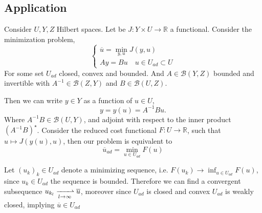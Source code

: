 \subsection{Application}
Consider $U, Y, Z$ Hilbert spaces. Let be  $J: Y\times U \rightarrow \mathbb{R}$ a functional. Consider the minimization problem,
\begin{equation*}
	\left\lbrace
	\begin{array}{l}
	\overline{u}=\underset{y,u}{\min} J(y,u) \\
	Ay=Bu \quad u \in U_{ad} \subset U
	\end{array}
	\right.
\end{equation*}
For some set $U_{ad}$ closed, convex and bounded. And $A \in \mathcal{B}(Y,Z)$ bounded and invertible with $A^{-1}\in \mathcal{B}(Z, Y)$ and $B\in \mathcal{B}(U, Z)$.

Then we can write $y \in Y$ as a function of $u \in U$,
\[
y=y(u)=A^{-1}Bu.
\]
Where $A^{-1}B \in \mathcal{B}(U, Y)$, and adjoint with respect to the inner product $(A^{-1}B)^\star$. Consider the reduced cost functional  $F:U\rightarrow \mathbb{R}$, such that $u\mapsto J(y(u), u)$, then our problem is equivalent to
\[
	\overline{u}_{ad}=\min_{u \in U_{ad}} F(u) 
\]

Let $(u_k)_k \in U_{ad}$ denote a minimizing sequence, i.e. $F(u_k) \rightarrow \inf_{u\in U_{ad}}F(u)$, since $u_k \in U_{ad}$ the sequence is bounded. Therefore we can find a convergent subsequence $u_{k_{l}} \xrightharpoonup[l\rightarrow \infty]{} \overline{u}$, moreover since $U_{ad}$ is closed and convex $U_{ad}$ is weakly closed, implying $\overline{u} \in U_{ad}$

